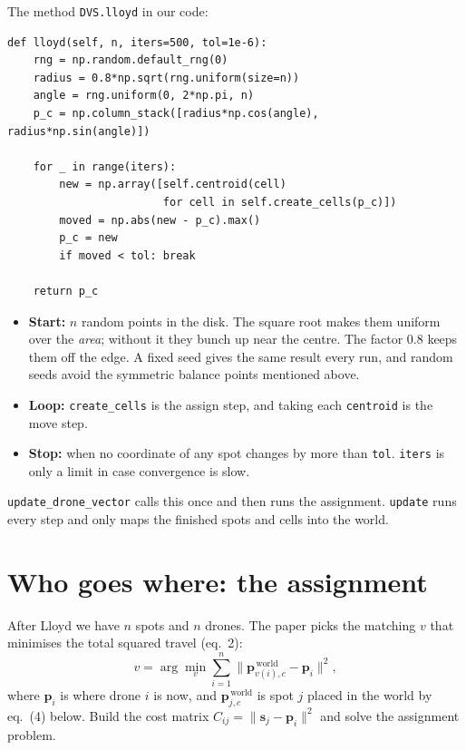 \documentclass[11pt,a4paper]{article}
\newcommand{\vect}[1]{\mathbf{#1}}
\begin{document}
\begin{oursbox}
The method \texttt{DVS.lloyd} in our code:
{\small
\begin{verbatim}
def lloyd(self, n, iters=500, tol=1e-6):
    rng = np.random.default_rng(0)
    radius = 0.8*np.sqrt(rng.uniform(size=n))
    angle = rng.uniform(0, 2*np.pi, n)
    p_c = np.column_stack([radius*np.cos(angle), radius*np.sin(angle)])

    for _ in range(iters):
        new = np.array([self.centroid(cell)
                        for cell in self.create_cells(p_c)])
        moved = np.abs(new - p_c).max()
        p_c = new
        if moved < tol: break

    return p_c
\end{verbatim}
}
\begin{itemize}[leftmargin=*]
\item \textbf{Start:} $n$ random points in the disk. The square root makes them uniform over the \emph{area}; without
it they bunch up near the centre. The factor $0.8$ keeps them off the edge. A fixed seed gives the same result every
run, and random seeds avoid the symmetric balance points mentioned above.
\item \textbf{Loop:} \texttt{create\_cells} is the assign step, and taking each \texttt{centroid} is the move step.
\item \textbf{Stop:} when no coordinate of any spot changes by more than \texttt{tol}. \texttt{iters} is only a limit
in case convergence is slow.
\end{itemize}
\texttt{update\_drone\_vector} calls this once and then runs the assignment. \texttt{update} runs every step and only
maps the finished spots and cells into the world.
\end{oursbox}

\section{Who goes where: the assignment}\label{sec:hung}

After Lloyd we have $n$ spots and $n$ drones. The paper picks the matching $v$ that minimises the total squared travel
(eq.~2):
\begin{equation}
v=\arg\min_{v}\sum_{i=1}^n\big\|\vect{p}_{v(i),c}^{\,\mathrm{world}}-\vect{p}_i\big\|^2 ,\tag{2}
\end{equation}
where $\vect{p}_i$ is where drone $i$ is now, and $\vect{p}^{\,\mathrm{world}}_{j,c}$ is spot $j$ placed in the world
by eq.~(4) below. Build the cost matrix $C_{ij}=\|\vect{s}_j-\vect{p}_i\|^2$ and solve the assignment problem.
\end{document}
